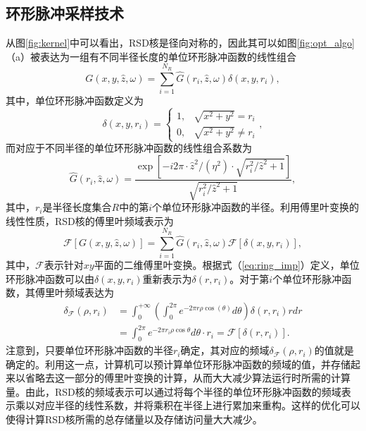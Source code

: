 \documentclass[master]{shtthesis}             %
\begin{document}
\subsection{环形脉冲采样技术}

从图\ref{fig:kernel}中可以看出，RSD核是径向对称的，因此其可以如图\ref{fig:opt_algo}（a）被表达为一组有不同半径长度的单位环形脉冲函数的线性组合
\begin{equation}
    G(x, y, \hat{z}, \omega) = \sum_{i=1}^{N_R}\hat{G}(r_i, \hat{z}, \omega)\delta(x, y, r_i),
\end{equation}
其中，单位环形脉冲函数定义为
\begin{equation}
    \delta(x, y, r_i) = \begin{cases}
      1, & \sqrt{x^2+y^2} = r_i\\
      0, & \sqrt{x^2+y^2} \neq r_i
    \end{cases}\label{eq:ring_imp},
\end{equation}
而对应于不同半径的单位环形脉冲函数的线性组合系数为
\begin{equation} \label{eq:ori_coef}
    \hat{G}(r_i, \hat{z}, \omega) = \frac{\exp{\left[-i2\pi\cdot\hat{z}^2/(\eta^2)\cdot\sqrt{r_i^2/\hat{z}^2+1}\right]}}{\sqrt{r_i^2/\hat{z}^2+1}},
\end{equation}
其中，$r_i$是半径长度集合$R$中的第$i$个单位环形脉冲函数的半径。利用傅里叶变换的线性性质，RSD核的傅里叶频域表示为
\begin{equation}
    \mathcal{F}\left[G(x, y, \hat{z}, \omega)\right] = \sum_{i=1}^{N_{ {R}}}\hat{G}(r_i, \hat{z}, \omega)\mathcal{F}\left[\delta(x, y, r_i)\right],
\end{equation}
其中，$\mathcal{F}$表示针对$xy$平面的二维傅里叶变换。根据式（\ref{eq:ring_imp}）定义，单位环形脉冲函数可以由$\delta(x,y,r_i)$重新表示为$\delta(r,r_i)$。对于第$i$个单位环形脉冲函数，其傅里叶频域表达为
\begin{equation}
    \begin{split}
        \delta_{\mathcal{F}}(\rho, r_i)&=\int_0^{+\infty}\left(\int_0^{2\pi}e^{-2\pi r\rho \cos (\theta)}d\theta\right)\delta(r, r_i)rdr\\
        &=\int^{2\pi}_0e^{-2\pi r_i\rho \cos \theta}d\theta \cdot r_i = \mathcal{F}\left[ \delta(r,r_i) \right].
    \end{split}
\end{equation}
注意到，只要单位环形脉冲函数的半径$r_i$确定，其对应的频域$\delta_{\mathcal{F}}(\rho,r_i)$的值就是确定的。利用这一点，计算机可以预计算单位环形脉冲函数的频域的值，并存储起来以省略去这一部分的傅里叶变换的计算，从而大大减少算法运行时所需的计算量。由此，RSD核的频域表示可以通过将每个半径的单位环形脉冲函数的频域表示乘以对应半径的线性系数，并将乘积在半径上进行累加来重构。这样的优化可以使得计算RSD核所需的总存储量以及存储访问量大大减少。
\end{document}

